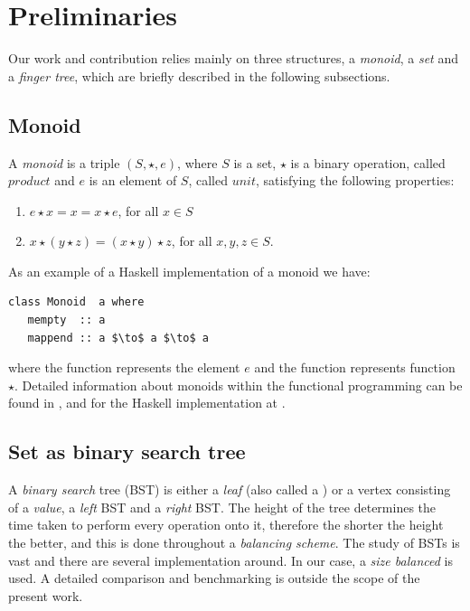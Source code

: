 \section{Preliminaries} 
\label{sec:Prelim} 

Our work and contribution relies mainly on three structures, a \textit{monoid}, a \textit{set} and a \textit{finger tree}, which are briefly described in the following subsections. 

\subsection{Monoid}

A \textit{monoid} is a triple $(S,\star,e)$, where $S$ is a set, $\star$ is a binary operation, called $product$ and $e$ is an element of $S$, called $unit$, satisfying the following properties:

\begin{enumerate}
\item $e \star x = x = x \star e$, for all $x \in S$ 
\item $x \star (y \star z) = (x \star y) \star z $, for all $x,y,z \in S$.  
\end{enumerate}

As an example of a Haskell implementation of a monoid we have:
\begin{lstlisting}[mathescape]
class Monoid  a where 
   mempty  :: a
   mappend :: a $\to$ a $\to$ a
\end{lstlisting}   

where the function  represents the element $e$ and the function  represents function $\star$. Detailed information about monoids within the functional programming can be found in \cite{Monoids}, and for the Haskell implementation at \cite{HaskellMonoid}.


\subsection{Set as binary search tree}
A \textit{binary search} tree (BST) is either a \textit{leaf} (also called a ) or a vertex consisting of a \textit{value}, a \textit{left} BST and a \textit{right} BST. The height of the tree determines the time taken to perform every operation onto it, therefore the shorter the height the better, and this is done throughout a \textit{balancing scheme}. The study of BSTs is vast and there are several implementation around. In our case, a \textit{size balanced} is used. A detailed comparison and benchmarking is outside the scope of the present work.

